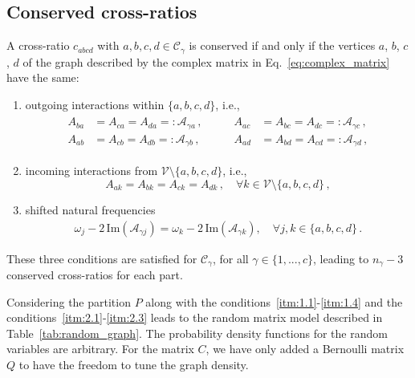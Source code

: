 \documentclass[aps,pre,reprint,longbibliography,superscriptaddress,noshowpacs,floatfix]{revtex4-2}
\theoremstyle{definition}
\theoremstyle{remark}
\begin{document}
\subsection{Conserved cross-ratios}

A cross-ratio $c_{abcd}$ with $a,b,c,d \in \mathcal{C}_\gamma$ is conserved if and only if the vertices $a$, $b$, $c$, $d$ of the graph described by the complex matrix in Eq.~\eqref{eq:complex_matrix} have the same:
\begin{enumerate}[label=\normalfont2.\arabic*.,ref=2.\arabic*, itemsep=0pt, topsep=2pt, parsep=0pt, partopsep=0pt]
\item \label{itm:2.1} outgoing interactions within $\{a,b,c,d\}$, i.e.,
\begin{align*}
\begin{aligned}
    A_{ba} &= A_{ca} = A_{da} =: \mathcal{A}_{\gamma a}\,,\\ 
    A_{ab} &= A_{cb} = A_{db} =: \mathcal{A}_{\gamma b}\,, 
\end{aligned}
\qquad
\begin{aligned}
    A_{ac} &= A_{bc} = A_{dc} =: \mathcal{A}_{\gamma c}\,, \\
    A_{ad} &= A_{bd} = A_{cd} =: \mathcal{A}_{\gamma d}\,,
\end{aligned}
\end{align*}

\item  \label{itm:2.2} incoming interactions from $\mathcal{V}\setminus\{a, b, c, d\}$, i.e.,
\begin{equation*}
    A_{ak} = A_{bk} = A_{ck} = A_{dk}\,,\quad \forall k\in\mathcal{V}\setminus\{a, b, c, d\}\,,
\end{equation*}

\item \label{itm:2.3} shifted natural frequencies
\begin{align*}
\omega_j - 2\,\mathrm{Im}(\mathcal{A}_{\gamma j}) = \omega_k - 2\,\mathrm{Im}(\mathcal{A}_{\gamma k}),\quad \forall j,k \in \{a,b,c,d\}\,.
\end{align*}

\end{enumerate}

These three conditions are satisfied for $\mathcal{C}_\gamma$, for all $\gamma \in \{1,...,c\}$, leading to $n_\gamma - 3$ conserved cross-ratios for each part. 

Considering the partition $P$ along with the conditions~\ref{itm:1.1}-\ref{itm:1.4} and the conditions~\ref{itm:2.1}-\ref{itm:2.3} leads to the random matrix model described in Table~\ref{tab:random_graph}. The probability density functions for the random variables are arbitrary. For the matrix $C$, we have only added a Bernoulli matrix $Q$ to have the freedom to tune the graph density. 
\end{document}

